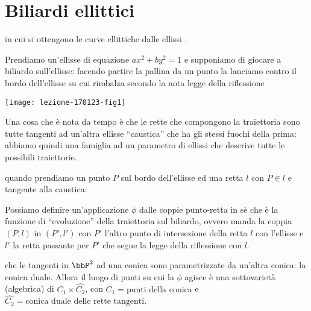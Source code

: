 
\section{Biliardi ellittici}
 in cui si ottengono le curve
ellittiche dalle ellissi .

Prendiamo un'ellisse di equazione $ax^2 + by^2 = 1$ e supponiamo di
giocare a biliardo sull'ellisse: facendo partire la pallina da un punto
la lanciamo contro il bordo dell'ellisse su cui rimbalza secondo la nota
legge della riflessione 

\begin{center}
  \texttt{[image: lezione-170123-fig1]}
\end{center}
  
Una cosa che è nota da tempo è che le rette che compongono la
traiettoria sono tutte tangenti ad un'altra ellisse ``caustica'' che ha
gli stessi fuochi della prima: abbiamo quindi una famiglia ad un
parametro di ellissi che descrive tutte le possibili traiettorie.

 quando prendiamo un punto $P$
sul bordo dell'ellisse ed una retta $l$ con $P \in l$ e tangente alla
caustica:

Possiamo definire un'applicazione $\phi$ dalle coppie punto-retta in sè
che è la funzione di ``evoluzione'' della traiettoria sul biliardo,
ovvero manda la coppia $(P, l)$ in $(P', l')$ con $P'$ l'altro punto di
intersezione della retta $l$ con l'ellisse e $l'$ la retta passante per
$P'$ che segue la legge della riflessione con $l$.


 che le tangenti in $\bbP^2$ ad una conica sono
parametrizzate da un'altra conica: la conica duale.
Allora il luogo di punti su cui la $\phi$ agisce è una sottovarietà
(algebrica) di $C_1 \times \hat{C_2}$, con $C_1 = \text{punti della
  conica}$ e $\hat{C_2} = \text{conica duale delle rette tangenti}$.

